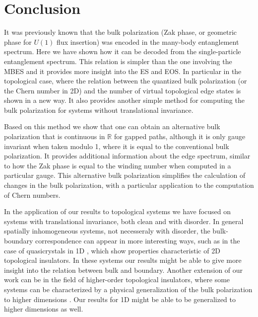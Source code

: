 \documentclass[twocolumn,amsmath,longbibliography,amssymb,superscriptaddress]{revtex4-1}
\newcommand{\tpo}{\tilde{\mathcal{P}}_{\rm o}}
\begin{document}
%
%
%




\section{Conclusion}

It was previously known that the bulk polarization (Zak phase, or geometric phase for $U(1)$ flux insertion) was encoded in the many-body entanglement spectrum. Here we have shown how it can be decoded from the single-particle entanglement spectrum. This relation is simpler than the one involving the MBES and it provides more insight into the ES and EOS. In particular in the topological case, where the relation between the quantized bulk polarization (or the Chern number in 2D) and the number of virtual topological edge states is shown in a new way. It also provides another simple method for computing the bulk polarization for systems without translational invariance. 

Based on this method we show that one can obtain an alternative bulk polarization that is continuous in $\mathbb{R}$ for gapped paths, although it is only gauge invariant when taken modulo 1, where it is equal to the conventional bulk polarization. It provides additional information about the edge spectrum, similar to how the Zak phase is equal to the winding number when computed in a particular gauge. This alternative bulk polarization simplifies the calculation of changes in the bulk polarization, with a particular application to the computation of Chern numbers.

In the application of our results to topological systems we have focused on systems with translational invariance, both clean and with disorder. In general spatially inhomogeneous systems, not necesseraly with disorder, the bulk-boundary correspondence can appear in more interesting ways, such as in the case of quasicrystals in 1D \cite{Lang2012,Kraus2012}, which show properties characteristic of 2D topological insulators. In these systems our results might be able to give more insight into the relation between bulk and boundary. Another extension of our work can be in the field of higher-order topological insulators, where some systems can be characterized by a physical generalization of the bulk polarization to higher dimensions \cite{Benalcazar2017,Kang2019}. Our results for 1D might be able to be generalized to higher dimensions as well.
\end{document}

